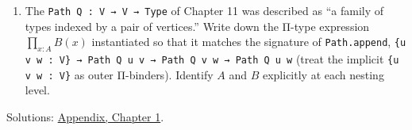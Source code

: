 \begin{enumerate}
\item
  The \texttt{Path Q : V → V → Type} of Chapter 11 was described as ``a family of types indexed by a pair of vertices.'' Write down the Π-type expression \(\prod_{x:A} B(x)\) instantiated so that it matches the signature of \texttt{Path.append}, \texttt{\{u v w : V\} → Path Q u v → Path Q v w → Path Q u w} (treat the implicit \texttt{\{u v w : V\}} as outer Π-binders). Identify \(A\) and \(B\) explicitly at each nesting level.
\end{enumerate}

Solutions: \hyperref[sec:14-appendix-solutions:01-chapter-1:1]{Appendix, Chapter 1}.
